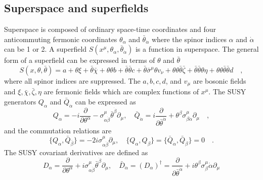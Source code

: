 \subsection{Superspace and superfields}
\label{subsec:susy_superspace_and_superfields}
Superspace is composed of ordinary space-time coordinates and four anticommuting fermonic coordinates $\theta_{\alpha}$ and $\bar{\theta}_{\dot{\alpha}}$ where the spinor indices $\alpha$ and $\dot{\alpha}$ can be 1 or 2. 
A superfield $S(x^{\mu}, \theta_{\alpha}, \bar{\theta}_{\dot{\alpha}})$ is a function in superspace.
The general form of a superfield can be expressed in terms of $\theta$ and $\bar{\theta}$
%
\begin{equation}
    S(x, \theta, \bar{\theta}) = a + \theta \xi + \bar{\theta} \bar{\chi} + \theta \theta b + \bar{\theta}\bar{\theta}c + \bar{\theta}\bar{\sigma}^{\mu}\theta v_{\nu} + \theta \theta \bar{\theta} \bar{\zeta} + \bar{\theta} \bar{\theta} \theta \eta + \theta \theta \bar{\theta} \bar{\theta} d \quad ,
    \label{eq:susy_superfield}
\end{equation}
%
where all spinor indices are suppressed.
The $a, b, c, d$, and $v_{\mu}$ are bosonic fields and $\xi, \bar{\chi}, \bar{\zeta}, \eta$ are fermonic fields which are complex functions of $x^{\mu}$.
The SUSY generators $Q_{\alpha}$ and $\bar{Q}_{\dot{\alpha}}$ can be expressed as
%
\begin{equation}
    Q_{\alpha} = -i \frac{\partial}{\partial \theta^{\alpha}} - \sigma^{\mu}_{\alpha \dot{\beta}} \bar{\theta}^{\dot{\beta}} \partial_{\mu}, \quad
    \bar{Q}_{\dot{\alpha}} = i \frac{\partial}{\partial \bar{\theta}^{\dot{\alpha}}} + \theta^{\beta} \sigma^{\mu}_{\beta \dot{\alpha}} \partial_{\mu} \quad ,
    \label{eq:susy_susy_generators}
\end{equation}
%
and the commutation relations are
%
\begin{equation}
    \{Q_{\alpha}, \bar{Q}_{\bar{\beta}}\} = -2i \sigma^{\mu}_{\alpha \dot{\beta}} \partial_{\mu}, \quad
    \{Q_{\alpha}, Q_{\beta}\} = \{\bar{Q}_{\dot{\alpha}}, \bar{Q}_{\dot{\beta}}\} = 0 \quad .
    \label{eq:susy_susy_generator_commutation_relations}
\end{equation}
%
The SUSY covariant derivatives are defined as
%
\begin{equation}
    D_{\alpha} = \frac{\partial}{\partial \theta^{\alpha}} + i \sigma^{\mu}_{\alpha \dot{\beta}} \bar{\theta}^{\dot{\beta}} \partial_{\mu}, \quad
    \bar{D}_{\dot{\alpha}} = (D_{\alpha})^{\dagger} = \frac{\partial}{\partial \bar{\theta}^{\dot{\alpha}}} + i \theta^{\beta} \sigma^{\mu}_{\beta}{\dot{\alpha}} \partial_{\mu}
    \label{eq:susy_susy_covariant_derivatives}
\end{equation}

